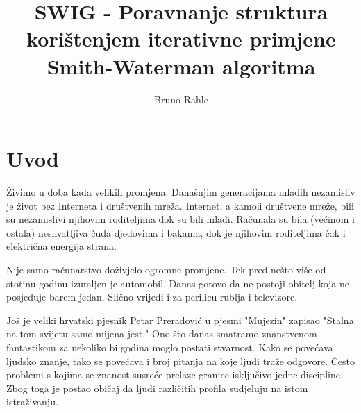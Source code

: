 \documentclass[times, utf8, zavrsni]{fer}
\begin{document}
%


\title{SWIG - Poravnanje struktura korištenjem iterativne primjene Smith-Waterman algoritma}

\author{Bruno Rahle}

\maketitle

\izvornik


\tableofcontents

\listoffigures

\listoftables

\chapter{Uvod}

Živimo u doba kada velikih promjena. Današnjim generacijama mladih nezamisliv
je život bez Interneta i društvenih mreža. Internet, a kamoli društvene mreže,
bili su nezamislivi njihovim roditeljima dok su bili mladi. Računala
su bila (većinom i ostala) neshvatljiva čuda djedovima i bakama, dok
je njihovim roditeljima čak i električna energija strana. 

Nije samo računarstvo doživjelo ogromne promjene. Tek pred nešto više od 
stotinu godinu izumljen je automobil. Danas gotovo da ne postoji obitelj
koja ne posjeduje barem jedan. Slično vrijedi i za perilicu rublja i 
televizore.

Još je veliki hrvatski pjesnik Petar Preradović u pjesmi "Mujezin" 
zapisao "Stalna na tom svijetu samo mijena jest." Ono što danas smatramo
znanstvenom fantastikom za nekoliko bi godina moglo postati stvarnost. 
Kako se povećava ljudsko znanje, tako se povećava i broj pitanja na 
koje ljudi traže odgovore. Često problemi s kojima se znanost 
susreće prelaze granice isključivo jedne discipline. Zbog toga je postao
običaj da ljudi različitih profila sudjeluju na istom
istraživanju. 
\end{document}
